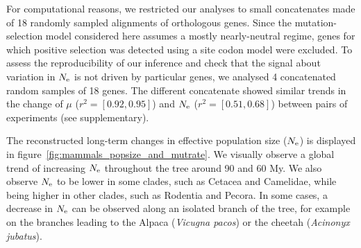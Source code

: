 \documentclass{article}
\begin{document}
    For computational reasons, we restricted our analyses to small concatenates made of 18 randomly sampled alignments of orthologous genes.
    Since the mutation-selection model considered here assumes a mostly nearly-neutral regime, genes for which positive selection was detected using a site codon model were excluded.
    To assess the reproducibility of our inference and check that the signal about variation in $N_{\text{e}}$ is not driven by particular genes, we analysed 4 concatenated random samples of 18 genes.
    The different concatenate showed similar trends in the change of $\mu$ ($r^2=[0.92,0.95]$) and $N_{\text{e}}$ ($r^2=[0.51,0.68]$) between pairs of experiments (see supplementary).

    The reconstructed long-term changes in {effective population size} ($N_{\text{e}}$) is displayed in figure~\ref{fig:mammals_popsize_and_mutrate}.
    We visually observe a global trend of increasing $N_{\text{e}}$ throughout the tree around 90 and 60 My.
    We also observe $N_{\text{e}}$ to be lower in some clades, such as Cetacea and Camelidae, while being higher in other clades, such as Rodentia and Pecora.
    In some cases, a decrease in $N_{\text{e}}$ can be observed along an isolated branch of the tree, for example on the branches leading to the Alpaca (\textit{Vicugna pacos}) or the cheetah (\textit{Acinonyx jubatus}).
\end{document}
